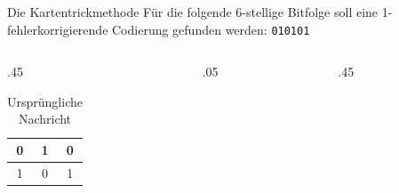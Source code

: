 \begin{frame}{Die Kartentrickmethode}
    Für die folgende 6-stellige Bitfolge soll eine 1-fehlerkorrigierende Codierung gefunden werden: \texttt{010101}
    \begin{columns}
        \begin{column}{.45\textwidth}
            \begin{table}[H]
                \centering
                \begin{tabular}{ccc}
                    0 & 1 & 0 \\\midrule
                    1 & 0 & 1 \\
                \end{tabular}
                \caption*{Ursprüngliche Nachricht}
                \label{tab:ex-zauberer}
            \end{table}
        \end{column}
        \begin{column}{.05\textwidth}
        \end{column}
        \begin{column}{.45\textwidth}
        \end{column}
    \end{columns}
\end{frame}

